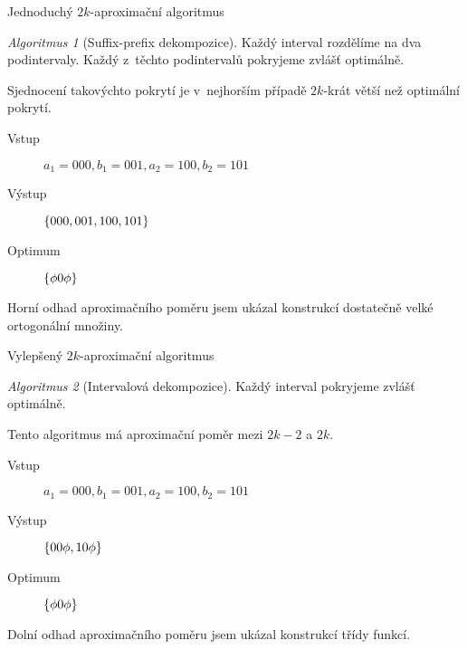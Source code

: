 \documentclass{beamer}
\theoremstyle{remark}
\newtheorem{algorithm}{Algoritmus}
\begin{document}
\begin{frame}{Jednoduchý $2k$-aproximační algoritmus}
\begin{algorithm}[Suffix-prefix dekompozice]
Každý interval rozdělíme na dva  podintervaly.
Každý z~těchto podintervalů pokryjeme zvlášť optimálně.
\end{algorithm}

Sjednocení takovýchto pokrytí je v~nejhorším případě $2k$-krát větší než optimální pokrytí.

\begin{example}
\begin{description}
\item[Vstup]
$a_1 = 000, b_1 = 001, a_2 = 100, b_2 = 101$

\item[Výstup]
$\{000, 001, 100, 101\}$

\item[Optimum]
$\{\phi 0 \phi\}$
\end{description}
\end{example}

Horní odhad aproximačního poměru jsem ukázal konstrukcí dostatečně velké ortogonální množiny.
\end{frame}

\begin{frame}{Vylepšený $2k$-aproximační algoritmus}
\begin{algorithm}[Intervalová dekompozice]
Každý interval pokryjeme zvlášť optimálně.
\end{algorithm}

Tento algoritmus má aproximační poměr mezi $2k-2$ a $2k$.

\begin{example}
\begin{description}
\item[Vstup]
$a_1 = 000, b_1 = 001, a_2 = 100, b_2 = 101$

\item[Výstup]
$\{00 \phi, 10 \phi\}$

\item[Optimum]
$\{\phi 0 \phi\}$
\end{description}
\end{example}

Dolní odhad aproximačního poměru jsem ukázal konstrukcí třídy  funkcí.
\end{frame}

\end{document}
